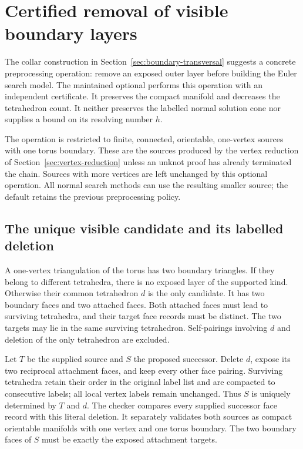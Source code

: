 \section{Certified removal of visible boundary layers}
\label{sec:boundary-unlayer}

The collar construction in Section~\ref{sec:boundary-transversal}
suggests a concrete preprocessing operation: remove an exposed outer
layer before building the Euler search model.  The maintained optional
 performs this operation with an independent
certificate.  It preserves the compact manifold and decreases the
tetrahedron count.  It neither preserves the labelled normal solution
cone nor supplies a bound on its resolving number $h$.

The operation is restricted to finite, connected, orientable,
one-vertex sources with one torus boundary.  These are the sources
produced by the vertex reduction of Section~\ref{sec:vertex-reduction}
unless an unknot proof has already terminated the chain.  Sources with
more vertices are left unchanged by this optional operation.  All
normal search methods can use the resulting smaller source; the default
 retains the previous preprocessing policy.

\subsection{The unique visible candidate and its labelled deletion}

A one-vertex triangulation of the torus has two boundary triangles.
If they belong to different tetrahedra, there is no exposed layer of
the supported kind.  Otherwise their common tetrahedron $d$ is the only
candidate.  It has two boundary faces and two attached faces.  Both
attached faces must lead to surviving tetrahedra, and their target
face records must be distinct.  The two targets may lie in the same
surviving tetrahedron.  Self-pairings involving $d$ and deletion of the
only tetrahedron are excluded.

Let $T$ be the supplied source and $S$ the proposed successor.  Delete
$d$, expose its two reciprocal attachment faces, and keep every other
face pairing.  Surviving tetrahedra retain their order in the original
label list and are compacted to consecutive labels; all local vertex
labels remain unchanged.  Thus $S$ is uniquely determined by $T$ and
$d$.  The checker compares every supplied successor face record with
this literal deletion.  It separately validates both sources as compact
orientable manifolds with one vertex and one torus boundary.  The two
boundary faces of $S$ must be exactly the exposed attachment targets.

